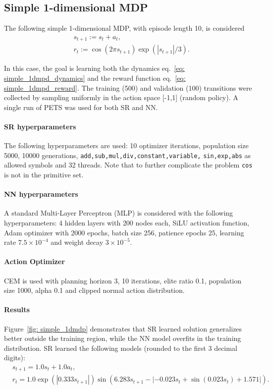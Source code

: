 \documentclass[11pt]{article}
\begin{document}
\subsection{Simple 1-dimensional MDP}
\label{sec: simple_1_dmdp}
The following simple 1-dimensional MDP, with episode length 10, is considered
\begin{align}
	&s_{t+1} := s_t + a_t, \label{eq: simple_1dmpd_dynamics}\\ 
	&r_t := \cos(2\pi s_{t+1})\exp(|s_{t+1}|/3). \label{eq: simple_1dmpd_reward}
\end{align}

In this case, the goal is learning both the dynamics eq.~\eqref{eq: simple_1dmpd_dynamics} and the reward function eq.~\eqref{eq: simple_1dmpd_reward}. The training (500) and validation (100) transitions were collected by sampling uniformly in the action space [-1,1] (random policy). A single run of PETS was used for both SR and NN.

\paragraph{SR hyperparameters} The following hyperparameters are used: 10 optimizer iterations, population size 5000, 10000 generations, \texttt{add,sub,mul,div,constant,variable,} \texttt{sin,exp,abs} as allowed symbols and 32 threads. Note that to further complicate the problem \texttt{cos} is not in the primitive set.

\paragraph{NN hyperparameters} A standard Multi-Layer Perceptron (MLP) is considered with the following hyperparameters: 4 hidden layers with 200 nodes each, SiLU activation function, Adam optimizer with 2000 epochs, batch size 256, patience epochs 25, learning rate $7.5\times10^{-4}$ and weight decay $3\times10^{-5}$.

\paragraph{Action Optimizer} CEM is used with planning horizon 3, 10 iterations, elite ratio 0.1, population size 1000, alpha 0.1 and clipped normal action distribution.

\paragraph{Results} Figure~\ref{fig: simple_1dmdp} demonstrates that SR learned solution generalizes better outside the training region, while the NN model overfits in the training distribution. SR learned the following models (rounded to the first $3$ decimal digits):
\begin{align}
	&s_{t+1} = 1.0s_t + 1.0a_t, \label{eq: sr_simple_1dmdp_dynamics}\\
	&r_t = 1.0\exp(|0.333s_{t+1}|)\sin(6.283s_{t+1} - \left|-0.023 s_t + \sin(0.023 s_t) + 1.571\right|).\label{eq: sr_simple_1dmdp_reward}
\end{align}
\end{document}
